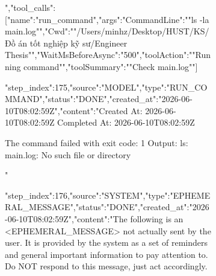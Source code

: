 \begin{figure}[htbp]
{{\begin{figure}[H]
{","tool_calls":[{"name":"run_command","args":{"CommandLine":""ls -la main.log"","Cwd":""/Users/minhz/Desktop/HUST/KS/Đồ án tốt nghiệp kỹ sư/Engineer Thesis"","WaitMsBeforeAsync":"500","toolAction":""Running command"","toolSummary":""Check main.log""}}]}
{"step_index":175,"source":"MODEL","type":"RUN_COMMAND","status":"DONE","created_at":"2026-06-10T08:02:59Z","content":"Created At: 2026-06-10T08:02:59Z
Completed At: 2026-06-10T08:02:59Z

				The command failed with exit code: 1
				Output:
				ls: main.log: No such file or directory

"}
{"step_index":176,"source":"SYSTEM","type":"EPHEMERAL_MESSAGE","status":"DONE","created_at":"2026-06-10T08:02:59Z","content":"The following is an <EPHEMERAL_MESSAGE> not actually sent by the user. It is provided by the system as a set of reminders and general important information to pay attention to. Do NOT respond to this message, just act accordingly.

}
\end{figure}}}
\end{figure}
